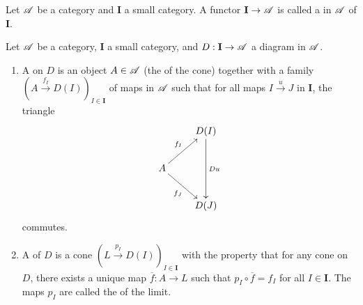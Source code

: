\begin{definition}
    Let $\mathscr A$ be a category and $\mathbf{I}$ a small category. A functor $\mathbf{I}\to\mathscr A$ is called a  in $\mathscr A$ of  $\mathbf{I}$.
\end{definition}

\begin{definition}
    Let $\mathscr A$ be a category, $\mathbf{I}$ a small category, and $D: \mathbf{I}\to\mathscr A$ a diagram in $\mathscr A$. 
    \begin{enumerate}[label=(\alph*)]
        \item A  on $D$ is an object $A\in\mathscr A$ (the  of the cone) together with a family $\left(A\xrightarrow{f_I} D(I)\right)_{I\in\mathbf{I}}$ of maps in $\mathscr A$ such that for all maps $I\xrightarrow{u} J$ in $\mathbf{I}$, the triangle 
        \begin{equation*}
            \xymatrix {
                & D(I)\ar[dd]^{Du}\\
                A\ar[ru]^{f_I}\ar[rd]_{f_J} & \\
                & D(J)
            }
        \end{equation*}
        commutes.

        \item A  of $D$ is a cone $\left(L\xrightarrow{p_I} D(I)\right)_{I\in\mathbf{I}}$ with the property that for any cone on $D$, there exists a unique map $\overline f: A\to L$ such that $p_I\circ\overline f = f_I$ for all $I\in\mathbf{I}$. The maps $p_I$ are called the  of the limit.
    \end{enumerate}
\end{definition}

